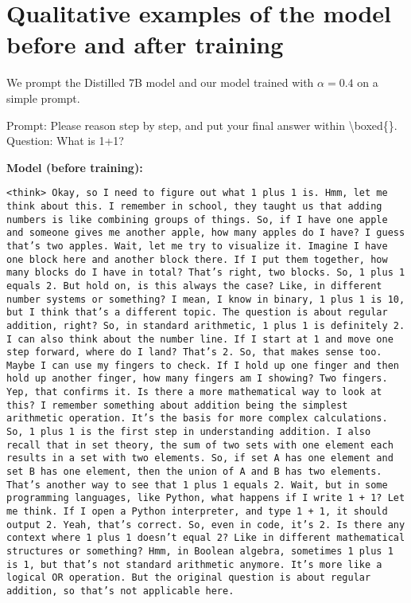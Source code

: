 \newpage
\clearpage
\appendix


\section{Qualitative examples of the model before and after training}
\label{app:1+1}

We prompt the Distilled 7B model and our model trained with $\alpha=0.4$ on a simple prompt. 


Prompt: Please reason step by step, and put your final answer within \textbackslash boxed\{\}. Question: What is 1+1?

\textbf{Model (before training):}

\texttt{<think>
Okay, so I need to figure out what 1 plus 1 is. Hmm, let me think about this. I remember in school, they taught us that adding numbers is like combining groups of things. So, if I have one apple and someone gives me another apple, how many apples do I have? I guess that's two apples. 
Wait, let me try to visualize it. Imagine I have one block here and another block there. If I put them together, how many blocks do I have in total? That's right, two blocks. So, 1 plus 1 equals 2. 
But hold on, is this always the case? Like, in different number systems or something? I mean, I know in binary, 1 plus 1 is 10, but I think that's a different topic. The question is about regular addition, right? So, in standard arithmetic, 1 plus 1 is definitely 2. 
I can also think about the number line. If I start at 1 and move one step forward, where do I land? That's 2. So, that makes sense too. 
Maybe I can use my fingers to check. If I hold up one finger and then hold up another finger, how many fingers am I showing? Two fingers. Yep, that confirms it. 
Is there a more mathematical way to look at this? I remember something about addition being the simplest arithmetic operation. It's the basis for more complex calculations. So, 1 plus 1 is the first step in understanding addition. 
I also recall that in set theory, the sum of two sets with one element each results in a set with two elements. So, if set A has one element and set B has one element, then the union of A and B has two elements. That's another way to see that 1 plus 1 equals 2.
Wait, but in some programming languages, like Python, what happens if I write 1 + 1? Let me think. If I open a Python interpreter, and type 1 + 1, it should output 2. Yeah, that's correct. So, even in code, it's 2. 
Is there any context where 1 plus 1 doesn't equal 2? Like in different mathematical structures or something? Hmm, in Boolean algebra, sometimes 1 plus 1 is 1, but that's not standard arithmetic anymore. It's more like a logical OR operation. But the original question is about regular addition, so that's not applicable here.
}
